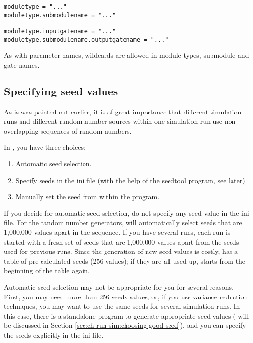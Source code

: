 \begin{Verbatim}
moduletype = "..."
moduletype.submodulename = "..."

moduletype.inputgatename = "..."
moduletype.submodulename.outputgatename = "..."
\end{Verbatim}

As with parameter names, wildcards
are allowed in module types, submodule and gate names.





\subsection{Specifying seed values}

As is was pointed out earlier, it is of great importance that 
different simulation runs and different random number sources 
within one simulation run use non-overlapping sequences of random 
numbers.


In {\opp}, you have three choices:
\begin{enumerate}
  \item{Automatic seed selection.}
  \item{Specify seeds in the ini file (with the help of the seedtool
    program, see later)}
  \item{Manually set the seed from within the program.}
\end{enumerate}

If you decide for automatic seed selection, do not specify any seed value in the ini file. For the
random number generators, {\opp} will automatically select seeds that
are 1,000,000 values apart in the sequence. If you have several runs,
each run is started with a fresh set of seeds that are 1,000,000
values apart from the seeds used for previous runs. Since the
generation of new seed values is costly, {\opp} has a table of
pre-calculated seeds (256 values); if they are all used up, {\opp}
starts from the beginning of the table again.


Automatic seed selection may not be appropriate for you for several
reasons. First, you may need more than 256 seeds values; or, if you
use variance reduction techniques, you may want to use the same seeds
for several simulation runs. In this case, there is a standalone
program to generate appropriate seed values ( will be
discussed in Section \ref{sec:ch-run-sim:choosing-good-seed}), and you
can specify the seeds explicitly in the ini file.



